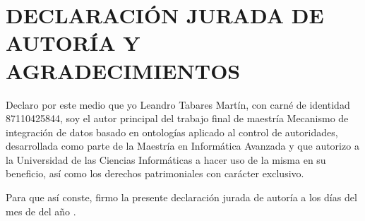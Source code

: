 \chapter*{\large DECLARACIÓN JURADA DE AUTORÍA Y AGRADECIMIENTOS}

\lhead{}
\chead{}
\lfoot{}
\cfoot{}
\rfoot{\thepage}
\renewcommand{\headrulewidth}{0.4pt}

Declaro por este medio que yo Leandro Tabares Martín, con carné de identidad 87110425844, soy el autor principal del trabajo final de maestría Mecanismo de integración de datos basado en ontologías aplicado al control de autoridades, desarrollada como parte de la Maestría en Informática Avanzada y que autorizo a la Universidad de las Ciencias Informáticas a hacer uso de la misma en su beneficio, así como los derechos patrimoniales con carácter exclusivo.

\espacios

Para que así conste, firmo la presente declaración jurada de autoría a los \fillDia días del mes de \fillMes del año \fillAnno.

\espacios
\espacios

\firmaTesis
